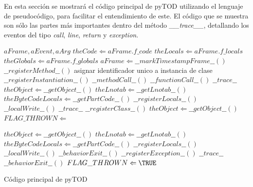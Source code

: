 \documentclass[12pt,legalpaper]{report}
\begin{document}
En esta sección se mostrará el código principal de pyTOD utilizando el lenguaje de pseudocódigo, para facilitar el entendimiento de este.  El código que se muestra son sólo las partes más importantes dentro del método \textit{\_\_trace\_\_}, detallando los eventos del tipo \textit{call}, \textit{line}, \textit{return} y \textit{exception}.
\begin{algorithm}
\begin{footnotesize}
\begin{algorithmic}[1]
\REQUIRE $aFrame, aEvent, aArg$
\STATE $theCode \Leftarrow aFrame.f\_code$
\STATE $theLocals \Leftarrow aFrame.f\_locals$
\STATE $theGlobals \Leftarrow aFrame.f\_globals$
\STATE $aFrame \Leftarrow \_\_markTimestampFrame\_\_()$
		\STATE $\_\_registerMethod\_\_()$
			\STATE asignar identificador unico a instancia de clase
			\STATE $\_\_registerInstantiation\_\_()$
		\ELSE
			\STATE $\_\_methodCall\_\_()$
		\ENDIF
	\ELSE
			\STATE $\_\_functionCall\_\_()$
		\ENDIF
	\ENDIF
	\RETURN $\_\_trace\_\_$
	\STATE $theObject \Leftarrow \_\_getObject\_\_()$
	\STATE $theLnotab \Leftarrow \_\_getLnotab\_\_()$
		\STATE $theByteCodeLocals \Leftarrow \_\_getPartCode\_\_()$
		\STATE $\_\_registerLocals\_\_()$
		\STATE $\_\_localWrite\_\_()$
	\ENDIF
	\RETURN $\_\_trace\_\_$
			\STATE $\_\_registerClass\_\_()$
		\ENDIF
	\ELSE
		\STATE $theObject \Leftarrow \_\_getObject\_\_()$
			\STATE $FLAG\_THROWN \Leftarrow$ \FALSE
		\ENDIF

		\STATE $theObject \Leftarrow \_\_getObject\_\_()$
		\STATE $theLnotab \Leftarrow \_\_getLnotab\_\_()$
			\STATE $theByteCodeLocals \Leftarrow \_\_getPartCode\_\_()$
			\STATE $\_\_registerLocals\_\_()$
			\STATE $\_\_localWrite\_\_()$
		\ENDIF
		\STATE $\_\_behaviorExit\_\_()$	
	\ENDIF
{}
	\STATE $\_\_registerException\_\_()$
		\RETURN $\_\_trace\_\_$
	\ENDIF
	\STATE $\_\_behaviorExit\_\_()$
	\STATE $FLAG\_THROWN \Leftarrow \TRUE$
\ENDIF
\end{algorithmic}
\end{footnotesize}
\caption{Código principal de pyTOD}
\end{algorithm}
\end{document}
